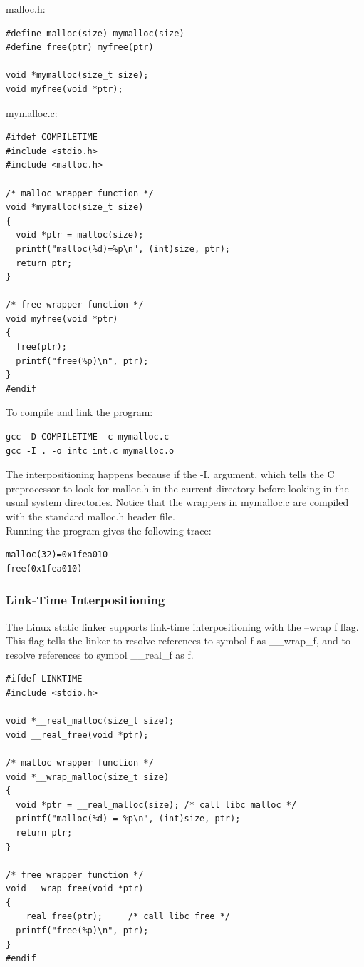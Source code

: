 \documentclass[11pt]{article}
\begin{document}
malloc.h:\\
\begin{verbatim}
#define malloc(size) mymalloc(size)
#define free(ptr) myfree(ptr)

void *mymalloc(size_t size);
void myfree(void *ptr);
\end{verbatim}

mymalloc.c:\\
\begin{verbatim}
#ifdef COMPILETIME
#include <stdio.h>
#include <malloc.h>

/* malloc wrapper function */
void *mymalloc(size_t size)
{
  void *ptr = malloc(size);
  printf("malloc(%d)=%p\n", (int)size, ptr);
  return ptr;
}

/* free wrapper function */
void myfree(void *ptr)
{
  free(ptr);
  printf("free(%p)\n", ptr);
}
#endif
\end{verbatim}


To compile and link the program:\\
\begin{verbatim}
gcc -D COMPILETIME -c mymalloc.c
gcc -I . -o intc int.c mymalloc.o
\end{verbatim}
The interpositioning happens because if the -I. argument, which tells the C preprocessor to look for malloc.h in the current directory before looking in the usual system directories. Notice that the wrappers in mymalloc.c are compiled with the standard malloc.h header file.\\


Running the program gives the following trace:\\
\begin{verbatim}
malloc(32)=0x1fea010
free(0x1fea010)
\end{verbatim}



\subsubsection{Link-Time Interpositioning}
\label{sec:orga255487}
The Linux static linker supports link-time interpositioning with the --wrap f flag. This flag tells the linker to resolve references to symbol f as \_\_wrap\_f, and to resolve references to symbol \_\_real\_f as f.\\

\begin{verbatim}
#ifdef LINKTIME
#include <stdio.h>

void *__real_malloc(size_t size);
void __real_free(void *ptr);

/* malloc wrapper function */
void *__wrap_malloc(size_t size)
{
  void *ptr = __real_malloc(size); /* call libc malloc */
  printf("malloc(%d) = %p\n", (int)size, ptr);
  return ptr;
}

/* free wrapper function */
void __wrap_free(void *ptr)
{
  __real_free(ptr);		/* call libc free */
  printf("free(%p)\n", ptr);
}
#endif
\end{verbatim}
\end{document}

